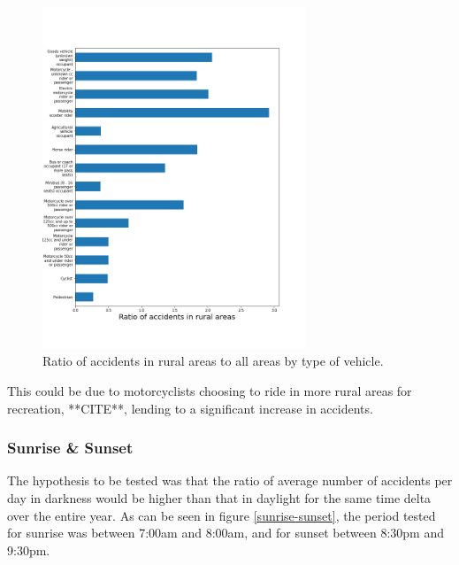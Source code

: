 \documentclass[12pt]{article}
\begin{document}
\begin{figure}[h]
\centering     %
\includegraphics[width=0.70\textwidth]{casualty_rural}
\caption{Ratio of accidents in rural areas to all areas by type of vehicle.}
\label{vehicle-rural}
\end{figure}


This could be due to motorcyclists choosing to ride in more rural areas for recreation, **CITE**, lending to a significant increase in accidents.

\newpage

\subsubsection{Sunrise \& Sunset}

The hypothesis to be tested was that the ratio of average number of accidents per day in darkness would be higher than that in daylight for the same time delta over the entire year. 
As can be seen in figure \ref{sunrise-sunset}, the period tested for sunrise was between 7:00am and 8:00am, and for sunset between 8:30pm and 9:30pm.
\end{document}
